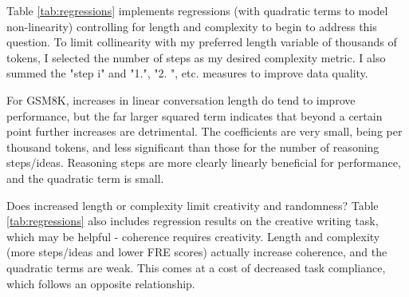 \documentclass[11pt]{article}
\begin{document}
Table \ref{tab:regressions} implements regressions (with quadratic terms to model non-linearity) controlling for length and complexity to begin to address this question. To limit collinearity with my preferred length variable of thousands of tokens, I selected the number of steps as my desired complexity metric. I also summed the "step i" and "1.", "2. ", etc. measures to improve data quality.

For GSM8K, increases in linear conversation length do tend to improve performance, but the far larger squared term indicates that beyond a certain point further increases are detrimental. The coefficients are very small, being per thousand tokens, and less significant than those for the number of reasoning steps/ideas. Reasoning steps are more clearly linearly beneficial for performance, and the quadratic term is small.

Does increased length or complexity limit creativity and randomness? Table \ref{tab:regressions} also includes regression results on the creative writing task, which may be helpful - coherence requires creativity. Length and complexity (more steps/ideas and lower FRE scores) actually increase coherence, and the quadratic terms are weak. This comes at a cost of decreased task compliance, which follows an opposite relationship.


\end{document}
